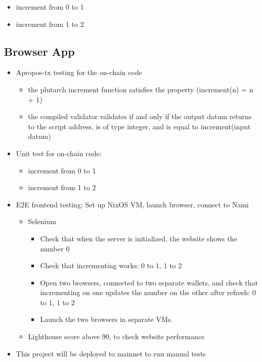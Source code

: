 \documentclass{article}
\begin{document}
\begin{itemize}
  \item increment from 0 to 1
  \item increment from 1 to 2
\end{itemize}

\subsection{Browser App}

\begin{itemize}
  \item Apropos-tx testing for the on-chain code
  \begin{itemize}
    \item the plutarch increment function satisfies the property (increment(n) = n + 1)
    \item the compiled validator validates if and only if the output datum returns to the script address, is of type integer, and is equal to increment(input datum)
  \end{itemize}
  \item Unit test for on-chain code:
  \begin{itemize}
    \item increment from 0 to 1
    \item increment from 1 to 2
  \end{itemize}
  \item E2E frontend testing: Set up NixOS VM, launch browser, connect to Nami
  \begin{itemize}
    \item Selenium
      \begin{itemize}
        \item Check that when the server is initialized, the website shows the
          number $0$
        \item Check that incrementing works: $0$ to $1$, $1$ to $2$
        \item Open two browsers, connected to two separate wallets, and check
          that incrementing on one updates the number on the other after
          refresh: $0$ to $1$, $1$ to $2$
        \item Launch the two browsers in separate VMs.
      \end{itemize}
    \item Lighthouse score above $90$, to check website performance
  \end{itemize}
  \item This project will be deployed to mainnet to run manual tests
\end{itemize}
\end{document}
